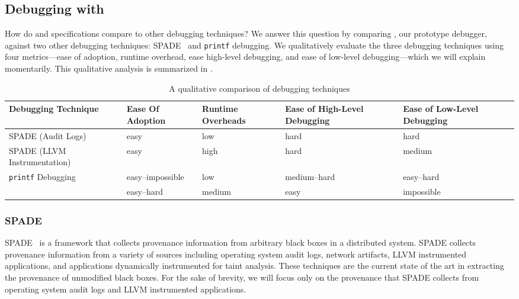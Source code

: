 \subsection{Debugging with \WatProvenance}
How do \watprovenance{} and \watprovenance{} specifications compare to other
debugging techniques? We answer this question by comparing \fluent{}, our
prototype \watprovenance{} debugger, against two other debugging techniques:
SPADE~\cite{gehani2012spade} and \texttt{printf} debugging. We qualitatively
evaluate the three debugging techniques using four metrics---ease of adoption,
runtime overhead, ease high-level debugging, and ease of low-level
debugging---which we will explain momentarily. This qualitative analysis is
summarized in .

\begin{table*}[t]
  \caption{A qualitative comparison of debugging techniques}
  \begin{tabular}{lllp{3cm}p{3cm}}
    \toprule
    Debugging Technique          & Ease Of Adoption & Runtime Overheads & Ease of High-Level Debugging & Ease of Low-Level Debugging \\\midrule
    SPADE (Audit Logs)           & easy             & low               & hard                         & hard \\
    SPADE (LLVM Instrumentation) & easy             & high              & hard                         & medium \\
    \texttt{printf} Debugging    & easy--impossible & low               & medium--hard                 & easy--hard \\
    \fluent{}                    & easy--hard       & medium            & easy                         & impossible \\
    \bottomrule
  \end{tabular}
\end{table*}

\subsubsection{SPADE}
SPADE~\cite{gehani2012spade} is a framework that collects provenance
information from arbitrary black boxes in a distributed system. SPADE collects
provenance information from a variety of sources including operating system
audit logs, network artifacts, LLVM instrumented applications, and applications
dynamically instrumented for taint analysis. These techniques are the current
state of the art in extracting the provenance of unmodified black boxes. For the
sake of brevity, we will focus only on the provenance that SPADE collects from
operating system audit logs and LLVM instrumented applications.

